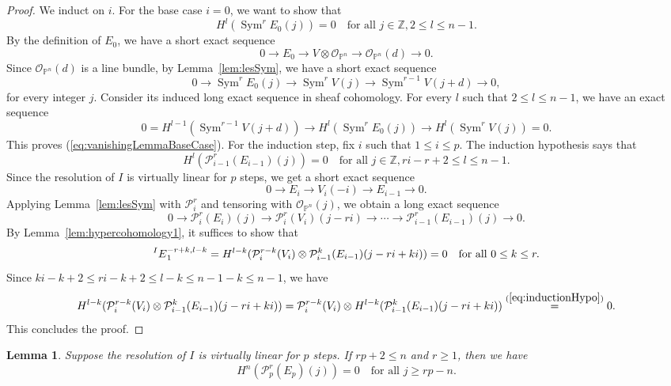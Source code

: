 \documentclass[11pt,letterpaper,reqno]{amsart}
\newcommand{\Sym}{\operatorname{Sym}}
\newcommand{\mc}[1]{\mathcal{#1}}
\def\PP{{\mathbb P}}
\def\lra{\longrightarrow}
\newtheorem{lemma}[theorem]{Lemma}
\theoremstyle{definition}
\numberwithin{equation}{section}
\begin{document}
\begin{proof}
    We induct on $i$. For the base case $i = 0$, we want to show that
    \begin{equation}\label{eq:vanishingLemmaBaseCase}
        H^l(\Sym^r E_0 (j)) = 0 \quad \text{for all }j \in \mathbb{Z}, 2 \le l \le n-1.
    \end{equation}
    By the definition of $E_0$, we have a short exact sequence
    \[0 \lra E_0 \lra V \otimes \mc{O}_{\PP^n} \lra \mc{O}_{\PP^n}(d) \lra 0.\]
    Since $\mc{O}_{\PP^n}(d)$ is a line bundle, by Lemma~\ref{lem:lesSym}, we have a short exact sequence
    \[0 \lra \Sym^r E_0(j) \lra \Sym^r V (j) \lra \Sym^{r-1}V (j+d) \lra 0,\]
    for every integer $j$.
    Consider its induced long exact sequence in sheaf cohomology. For every $l$ such that $2 \le l \le n-1$, we have an exact sequence
    \[0 = H^{l-1}(\Sym^{r-1}V(j+d)) \lra H^l(\Sym^rE_0(j)) \lra H^l(\Sym^r V (j)) = 0.\]
    This proves (\ref{eq:vanishingLemmaBaseCase}). For the induction step, fix $i$ such that $1 \le i\le p$. The induction hypothesis says that
    \begin{equation}\label{eq:inductionHypo}
        H^l(\mc{P}^r_{i-1} (E_{i-1}) (j)) = 0 \quad \text{for all }j \in \mathbb{Z}, ri - r + 2\le l \le n-1.
    \end{equation}
    Since the resolution of $I$ is virtually linear for $p$ steps, we get a short exact sequence
    \[0 \lra E_i \lra V_i(-i) \lra E_{i-1} \lra 0.\]
    Applying Lemma~\ref{lem:lesSym} with $\mc{P}_i^r$ and tensoring with $\mc{O}_{\PP^n}(j)$, we obtain a long exact sequence
    \[0\lra \mc{P}^r_i (E_i)(j) \lra \mc{P}_i^r(V_i)(j-ri)\lra \cdots \lra \mc{P}^r_{i-1}(E_{i-1})(j) \lra 0.\]
    By Lemma~\ref{lem:hypercohomology1}, it suffices to show that
    \[\prescript{I}{}{E}_1^{-r+k,l-k} = H^{l-k}(\mc{P}^{r-k}_i(V_i) \otimes \mc{P}^{k}_{i-1}(E_{i-1})(j-ri+ki))=0 \quad \text{for all }0 \le k \le r.\]
    Since $ki-k+2 \le ri-k+2 \le l-k \le n-1-k \le n-1$, we have
    \[H^{l-k}(\mc{P}^{r-k}_i(V_i) \otimes \mc{P}^{k}_{i-1}(E_{i-1})(j-ri+ki)) = \mc{P}^{r-k}_i(V_i) \otimes H^{l-k}(\mc{P}^{k}_{i-1}(E_{i-1})(j-ri+ki)) \overset{(\ref{eq:inductionHypo})}{=} 0.\]
    This concludes the proof.
\end{proof}
\begin{lemma}\label{lem:vanishing2'}
    Suppose the resolution of $I$ is virtually linear for $p$ steps. If $rp+2 \le n$ and $r \ge 1$, then we have
    \[H^n(\mc{P}^r_p(E_p)(j)) = 0 \quad \text{for all }j \ge rp-n.\]
\end{lemma}
\end{document}
